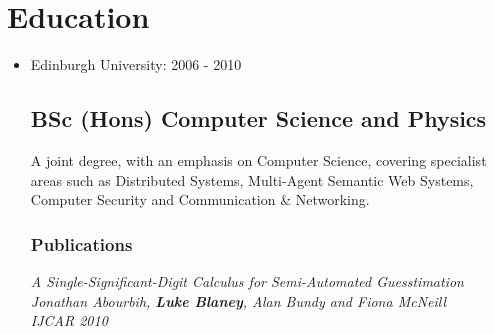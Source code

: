 \documentclass[a4paper]{article}
\newenvironment{detail}{\begin{adjustwidth}{10pt}{}}{\end{adjustwidth}}
\begin{document}
\section*{Education}
\begin{itemize}

\item Edinburgh University: 2006 - 2010
\subsection*{BSc (Hons) Computer Science and Physics}
\begin{detail}
A joint degree, with an emphasis on Computer Science, covering specialist areas such as Distributed Systems, Multi-Agent Semantic Web Systems, Computer Security and Communication \& Networking.
\subsubsection*{Publications}
\em A Single-Significant-Digit Calculus for Semi-Automated Guesstimation \em\\
Jonathan Abourbih, {\bf Luke Blaney}, Alan Bundy and Fiona McNeill\\
IJCAR 2010
\end{detail}

\end{itemize}
\end{document}
